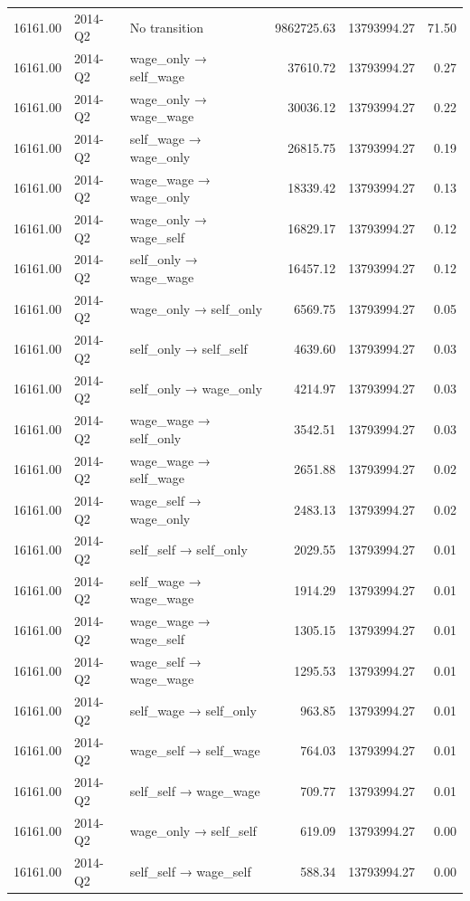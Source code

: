 \begin{table}[ht]
{\begin{tabular}{rllrrr}
  16161.00 & 2014-Q2 & No transition & 9862725.63 & 13793994.27 & 71.50 \\ 
  16161.00 & 2014-Q2 & wage\_only → self\_wage & 37610.72 & 13793994.27 & 0.27 \\ 
  16161.00 & 2014-Q2 & wage\_only → wage\_wage & 30036.12 & 13793994.27 & 0.22 \\ 
  16161.00 & 2014-Q2 & self\_wage → wage\_only & 26815.75 & 13793994.27 & 0.19 \\ 
  16161.00 & 2014-Q2 & wage\_wage → wage\_only & 18339.42 & 13793994.27 & 0.13 \\ 
  16161.00 & 2014-Q2 & wage\_only → wage\_self & 16829.17 & 13793994.27 & 0.12 \\ 
  16161.00 & 2014-Q2 & self\_only → wage\_wage & 16457.12 & 13793994.27 & 0.12 \\ 
  16161.00 & 2014-Q2 & wage\_only → self\_only & 6569.75 & 13793994.27 & 0.05 \\ 
  16161.00 & 2014-Q2 & self\_only → self\_self & 4639.60 & 13793994.27 & 0.03 \\ 
  16161.00 & 2014-Q2 & self\_only → wage\_only & 4214.97 & 13793994.27 & 0.03 \\ 
  16161.00 & 2014-Q2 & wage\_wage → self\_only & 3542.51 & 13793994.27 & 0.03 \\ 
  16161.00 & 2014-Q2 & wage\_wage → self\_wage & 2651.88 & 13793994.27 & 0.02 \\ 
  16161.00 & 2014-Q2 & wage\_self → wage\_only & 2483.13 & 13793994.27 & 0.02 \\ 
  16161.00 & 2014-Q2 & self\_self → self\_only & 2029.55 & 13793994.27 & 0.01 \\ 
  16161.00 & 2014-Q2 & self\_wage → wage\_wage & 1914.29 & 13793994.27 & 0.01 \\ 
  16161.00 & 2014-Q2 & wage\_wage → wage\_self & 1305.15 & 13793994.27 & 0.01 \\ 
  16161.00 & 2014-Q2 & wage\_self → wage\_wage & 1295.53 & 13793994.27 & 0.01 \\ 
  16161.00 & 2014-Q2 & self\_wage → self\_only & 963.85 & 13793994.27 & 0.01 \\ 
  16161.00 & 2014-Q2 & wage\_self → self\_wage & 764.03 & 13793994.27 & 0.01 \\ 
  16161.00 & 2014-Q2 & self\_self → wage\_wage & 709.77 & 13793994.27 & 0.01 \\ 
  16161.00 & 2014-Q2 & wage\_only → self\_self & 619.09 & 13793994.27 & 0.00 \\ 
  16161.00 & 2014-Q2 & self\_self → wage\_self & 588.34 & 13793994.27 & 0.00 \\ 

\end{tabular}}
\end{table}
